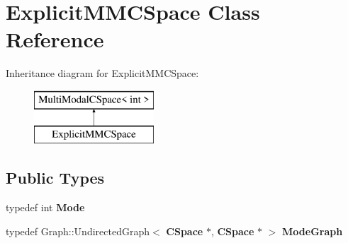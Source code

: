 \section{Explicit\+M\+M\+C\+Space Class Reference}
\label{classExplicitMMCSpace}
Inheritance diagram for Explicit\+M\+M\+C\+Space\+:\begin{figure}[H]
\begin{center}
\leavevmode
\includegraphics[height=2.000000cm]{classExplicitMMCSpace}
\end{center}
\end{figure}
\subsection*{Public Types}
\begin{DoxyCompactItemize}
\item 
typedef int {\bfseries Mode}\label{classExplicitMMCSpace_a0af02036bb571c63e731688b1d8c403d}

\item 
typedef Graph\+::\+Undirected\+Graph$<$ {\bf C\+Space} $\ast$, {\bf C\+Space} $\ast$ $>$ {\bfseries Mode\+Graph}\label{classExplicitMMCSpace_a091f2eedea51d71cf0ed1e9c2352cd3b}

\end{DoxyCompactItemize}
